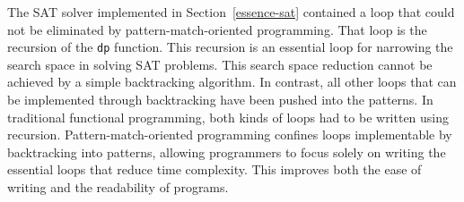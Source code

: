 The SAT solver implemented in Section~\ref{essence-sat} contained a loop that could not be eliminated by pattern-match-oriented programming.
That loop is the recursion of the \lstinline{dp} function.
This recursion is an essential loop for narrowing the search space in solving SAT problems.
This search space reduction cannot be achieved by a simple backtracking algorithm.
In contrast, all other loops that can be implemented through backtracking have been pushed into the patterns.
In traditional functional programming, both kinds of loops had to be written using recursion.
Pattern-match-oriented programming confines loops implementable by backtracking into patterns, allowing programmers to focus solely on writing the essential loops that reduce time complexity.
This improves both the ease of writing and the readability of programs.
